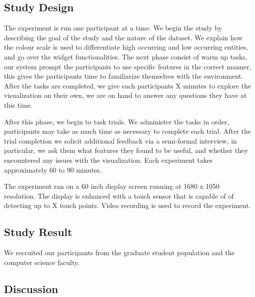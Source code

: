\subsection{Study Design}
The experiment is run one participant at a time. We begin the study by
describing the goal of the study and the nature of the dataset. We explain how
the colour scale is used to differentiate high occurring and low occurring
entities, and go over the widget functionalities. The next phase consist of warm
up tasks, our system prompt the participants to use specific features in the
correct manner, this gives the participants time to familiarize themselves with
the environment. After the tasks are completed, we give each participants X
minutes to explore the visualization on their own, we are on hand to answer any
questions they have at this time.

After this phase, we begin to task trials. We administer the tasks in order,
participants may take as much time as necessary to complete each trial. After
the trial completion we solicit additional feedback via a semi-formal interview,
in particular, we ask them what features they found to be useful, and whether
they encountered any issues with the visualization. Each experiment takes
approximately 60 to 90 minutes.

The experiment ran on a 60 inch display screen running at 1680 x 1050
resolution. The display is enhanced with a touch sensor that is capable of of
detecting up to X touch points. Video recording is used to record the
experiment.

\subsection{Study Result}
We recruited our participants from the graduate student population and the
computer science faculty.

\subsection{Discussion}